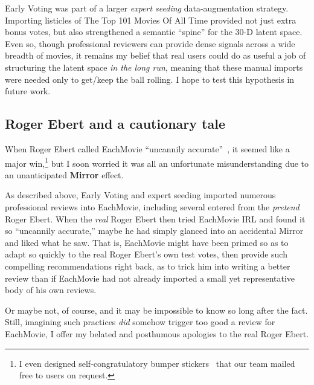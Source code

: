 \documentclass[sigconf,authorversion,screen,microtype={protrusion=true,expansion,kerning,spacing}]{acmart}
\begin{document}
Early Voting was part of a larger \emph{expert seeding} data-aug\-men\-ta\-tion strategy. Importing listicles of The Top 101 Movies Of All Time\texttrademark{} provided not just extra bonus votes, but also strengthened a semantic ``spine'' for the 30-D latent space. Even so, though professional reviewers can provide dense signals across a wide breadth of movies, it remains my belief that real users could do as useful a job of structuring the latent space \emph{in the long run}, meaning that these manual imports were needed only to get/\allowbreak{}keep the ball rolling.
I hope to test this hypothesis in future work.

\subsection{Roger Ebert and a cautionary tale}


When Roger Ebert called EachMovie ``uncannily accurate''~\cite{ebert1996critical}, it seemed like a major win,\footnote{I even designed self-congratulatory bumper stickers~\cite{BumperSticker1996} that our team mailed free to users on request.} but I soon worried it was all an unfortunate misunderstanding due to an unanticipated \textbf{Mirror} effect.

As described above, Early Voting and expert seeding imported numerous professional reviews into EachMovie, including several entered from the \emph{pretend} Roger Ebert. When the \emph{real} Roger Ebert then tried EachMovie IRL and found it so ``uncannily accurate,'' maybe he had simply glanced into an accidental Mirror and liked what he saw. That is, EachMovie might have been primed so as to adapt so quickly to the real Roger Ebert's own test votes, then provide such compelling recommendations right back, as to trick him into writing a better review than if EachMovie had not already imported a small yet representative body of his own reviews.

Or maybe not, of course, and it may be impossible to know so long after the fact. Still, imagining such practices \emph{did} somehow trigger too good a review for EachMovie, I offer my belated and posthumous apologies to the real Roger Ebert.
\end{document}
